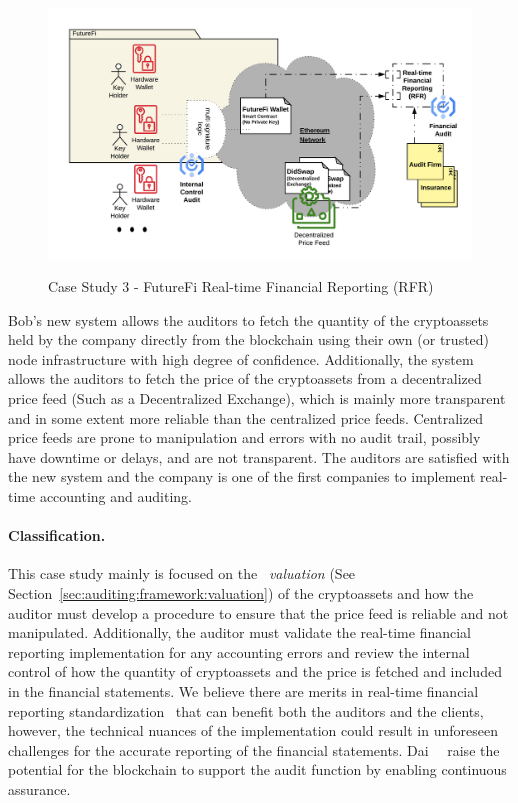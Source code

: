 \begin{figure}[t]
    \centering
{\includegraphics[width=1\textwidth]{figures/BlockchainAudit-FutureFi.png}}
{\caption[Case Study 3 - FutureFi Real-time Financial Reporting (RFR)]{Case Study 3 - FutureFi Real-time Financial Reporting (RFR)}\label{fig:RFR}}
\end{figure}


Bob's new system allows the auditors to fetch the quantity of the cryptoassets held by the company directly from the blockchain using their own (or trusted) node infrastructure with high degree of confidence. Additionally, the system allows the auditors to fetch the price of the cryptoassets from a decentralized price feed (Such as a Decentralized Exchange), which is mainly more transparent and in some extent more reliable than the centralized price feeds. Centralized price feeds are prone to manipulation and errors with no audit trail, possibly have downtime or delays, and are not transparent. The auditors are satisfied with the new system and the company is one of the first companies to implement real-time accounting and auditing. 

\paragraph{Classification.} This case study mainly is focused on the ~\textit{valuation} (See Section~\ref{sec:auditing:framework:valuation}) of the cryptoassets and how the auditor must develop a procedure to ensure that the price feed is reliable and not manipulated. Additionally, the auditor must validate the real-time financial reporting implementation for any accounting errors and review the internal control of how the quantity of cryptoassets and the price is fetched and included in the financial statements. We believe there are merits in real-time financial reporting standardization~\cite{bakarich2020use,yu2018blockchain} that can benefit both the auditors and the clients, however, the technical nuances of the implementation could result in unforeseen challenges for the accurate reporting of the financial statements. Dai~\etal~\cite{dai2017toward} raise the potential for the blockchain to support the audit function by enabling continuous assurance. 


